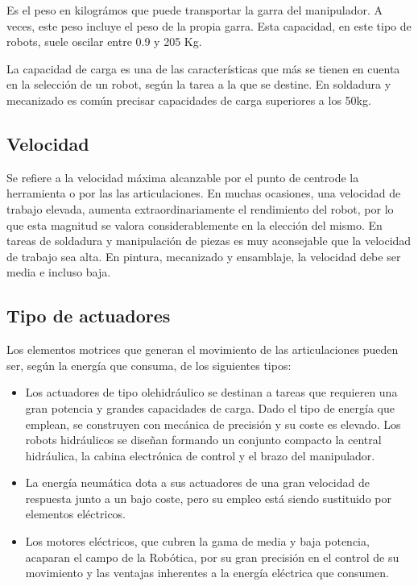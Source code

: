\documentclass[12pt,a4paper]{report}
\begin{document}
Es el peso en kilográmos que puede transportar la garra del manipulador. A
veces, este peso incluye el peso de la propia garra. Esta capacidad, en este
tipo de robots, suele oscilar entre 0.9 y 205 Kg. 

La capacidad de carga es una de las características que más se tienen en
cuenta en la selección de un robot, según la tarea a la que se destine. En
soldadura y mecanizado es común precisar capacidades de carga superiores a los
50kg.


\subsection{Velocidad}

Se refiere a la velocidad máxima alcanzable por el punto de centrode la
herramienta o por las las articulaciones.
En muchas ocasiones, una velocidad de trabajo elevada, aumenta
extraordinariamente el rendimiento del robot, por lo que esta magnitud se valora
considerablemente en la elección del mismo. En tareas de soldadura y
manipulación de piezas es muy aconsejable que la velocidad de trabajo sea alta.
En pintura, mecanizado y ensamblaje, la velocidad debe ser media e incluso baja.


\subsection{Tipo de actuadores}

Los elementos motrices que generan el movimiento de las articulaciones pueden
ser, según la energía que consuma, de los siguientes tipos:

\begin{itemize}
    \item Los actuadores de tipo olehidráulico se destinan a tareas que requieren una gran
    potencia y grandes capacidades de carga. Dado el tipo de energía que emplean, se
    construyen con mecánica de precisión y su coste es elevado. Los robots
    hidráulicos se diseñan formando un conjunto compacto la central hidráulica, la
    cabina electrónica de control y el brazo del manipulador.
    \item La energía neumática dota a sus actuadores de una gran velocidad de respuesta
    junto a un bajo coste, pero su empleo está siendo sustituido por elementos
    eléctricos.
    \item Los motores eléctricos, que cubren la gama de media y baja potencia, acaparan el
    campo de la Robótica, por su gran precisión en el control de su movimiento y las
    ventajas inherentes a la energía eléctrica que consumen.
\end{itemize}
\end{document}
